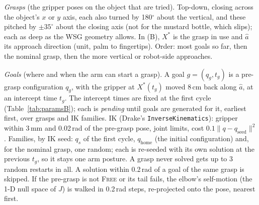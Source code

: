 \documentclass[conference]{IEEEtran}
\begin{document}
\emph{Grasps} (the gripper poses on the object that are tried). Top-down, closing across the object's $x$ or $y$
axis, each also turned by 180$^\circ$ about the vertical, and these pitched by $\pm35^\circ$ about the closing axis
(not for the mustard bottle, which slips); each as deep as the WSG geometry allows. In (B), $X^*$ is the grasp in
use and $\hat a$ its approach direction (unit, palm to fingertips). Order: most goals so far, then the nominal grasp,
then the more vertical or robot-side approaches.

\emph{Goals} (where and when the arm can start a grasp). A goal $g=(q_g,t_g)$ is a pre-grasp configuration $q_g$,
with the gripper at $X^*(t_g)$ moved 8\,cm back along $\hat a$, at an intercept time $t_g$. The intercept times are
fixed at the first cycle (Table~\ref{tab:paramsB}); each is \emph{pending} until goals are generated for it, earliest
first, over grasps and IK families. IK (Drake's
\texttt{InverseKinematics}): gripper within 3\,mm and 0.02\,rad of the pre-grasp pose, joint limits, cost
$0.1\lVert q-q_{\text{seed}}\rVert^2$. Families, by IK seed: $q_s$ of the first cycle, $q_{\text{home}}$ (the initial
configuration) and, for the nominal grasp, one random; each is re-seeded with its own solution at the previous $t_g$,
so it stays one arm posture. A grasp never solved gets up to 3 random restarts in all. A solution within 0.2\,rad of a
goal of the same grasp is skipped. If the pre-grasp is not \textsc{Free} or its tail fails, the elbow's self-motion
(the 1-D null space of $J$) is walked in 0.2\,rad steps, re-projected onto the pose, nearest first.
\end{document}
